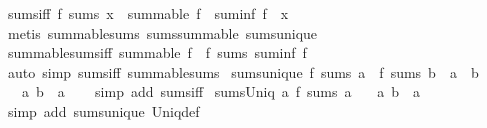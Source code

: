 \begin{isabellebody}
\endisatagproof
{\isafoldproof}%
%
\isadelimproof
\isanewline
%
\endisadelimproof
\isanewline
{}\isamarkupfalse%
\ sums{\isacharunderscore}{\kern0pt}iff{\isacharcolon}{\kern0pt}\ {\isachardoublequoteopen}f\ sums\ x\ {\isasymlongleftrightarrow}\ summable\ f\ {\isasymand}\ suminf\ f\ {\isacharequal}{\kern0pt}\ x{\isachardoublequoteclose}\isanewline
%
\isadelimproof
\ \ %
\endisadelimproof
%
\isatagproof
{}\isamarkupfalse%
\ {\isacharparenleft}{\kern0pt}metis\ summable{\isacharunderscore}{\kern0pt}sums\ sums{\isacharunderscore}{\kern0pt}summable\ sums{\isacharunderscore}{\kern0pt}unique{\isacharparenright}{\kern0pt}%
\endisatagproof
{\isafoldproof}%
%
\isadelimproof
\isanewline
%
\endisadelimproof
\isanewline
{}\isamarkupfalse%
\ summable{\isacharunderscore}{\kern0pt}sums{\isacharunderscore}{\kern0pt}iff{\isacharcolon}{\kern0pt}\ {\isachardoublequoteopen}summable\ f\ {\isasymlongleftrightarrow}\ f\ sums\ suminf\ f{\isachardoublequoteclose}\isanewline
%
\isadelimproof
\ \ %
\endisadelimproof
%
\isatagproof
{}\isamarkupfalse%
\ {\isacharparenleft}{\kern0pt}auto\ simp{\isacharcolon}{\kern0pt}\ sums{\isacharunderscore}{\kern0pt}iff\ summable{\isacharunderscore}{\kern0pt}sums{\isacharparenright}{\kern0pt}%
\endisatagproof
{\isafoldproof}%
%
\isadelimproof
\isanewline
%
\endisadelimproof
\isanewline
{}\isamarkupfalse%
\ sums{\isacharunderscore}{\kern0pt}unique{}{\isacharcolon}{\kern0pt}\ {\isachardoublequoteopen}f\ sums\ a\ {\isasymLongrightarrow}\ f\ sums\ b\ {\isasymLongrightarrow}\ a\ {\isacharequal}{\kern0pt}\ b{\isachardoublequoteclose}\isanewline
\ \ \ a\ b\ {\isacharcolon}{\kern0pt}{\isacharcolon}{\kern0pt}\ {\isacharprime}{\kern0pt}a\isanewline
%
\isadelimproof
\ \ %
\endisadelimproof
%
\isatagproof
{}\isamarkupfalse%
\ {\isacharparenleft}{\kern0pt}simp\ add{\isacharcolon}{\kern0pt}\ sums{\isacharunderscore}{\kern0pt}iff{\isacharparenright}{\kern0pt}%
\endisatagproof
{\isafoldproof}%
%
\isadelimproof
\isanewline
%
\endisadelimproof
\isanewline
{}\isamarkupfalse%
\ sums{\isacharunderscore}{\kern0pt}Uniq{\isacharcolon}{\kern0pt}\ {\isachardoublequoteopen}{\isasymexists}\isactrlsub {\isasymle}a{\isachardot}{\kern0pt}\ f\ sums\ a{\isachardoublequoteclose}\isanewline
\ \ \ a\ b\ {\isacharcolon}{\kern0pt}{\isacharcolon}{\kern0pt}\ {\isacharprime}{\kern0pt}a\isanewline
%
\isadelimproof
\ \ %
\endisadelimproof
%
\isatagproof
{}\isamarkupfalse%
\ {\isacharparenleft}{\kern0pt}simp\ add{\isacharcolon}{\kern0pt}\ sums{\isacharunderscore}{\kern0pt}unique{}\ Uniq{\isacharunderscore}{\kern0pt}def{\isacharparenright}{\kern0pt}%

\end{isabellebody}
